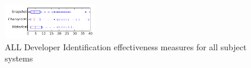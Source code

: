 
\begin{figure}[t]
\centering
\includegraphics[width=0.36\textwidth]{figures/dit/all_tiny}
\caption{ALL Developer Identification effectiveness measures for all subject systems}
\label{fig:dit:all:tiny}
\end{figure}
